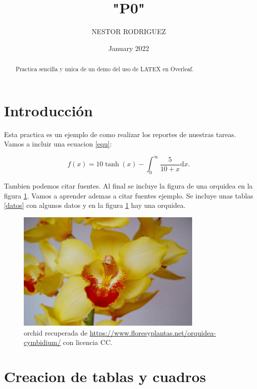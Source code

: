 \documentclass{article}
\title{"P0"} %
\author{NESTOR RODRIGUEZ} %
\date{January 2022}
\begin{document}

\maketitle %

\begin{abstract} %
  Practica sencilla y unica de un demo del uso de LATEX en
  Overleaf.
\end{abstract}

\section{Introducci\'{o}n}\label{intro} %



Esta practica es un ejemplo de como realizar los reportes de nuestras tareas. Vamos a incluir una ecuacion \eqref{equ}:

\begin{equation}
  f(x) = 10 \tanh(x) - \int_0^\infty \frac{5}{10 + x} \text{d}x.
  \label{equ}
\end{equation}

Tambien podemos citar fuentes. Al final se incluye la figura de una orquidea en la figura \ref{flor}. Vamos a aprender ademas a citar fuentes {ejemplo}.
Se incluye unas tablas \ref{datos} con algunos datos y en la figura \citep{imagen} \ref{flor} hay una orquidea.

\begin{figure} %
    \centering
    \includegraphics [width=90mm]{orchid.jpg} %
    \caption{orchid recuperada de \url{https://www.floresyplantas.net/orquidea-cymbidium/} con licencia CC.}
    \label{flor}
\end{figure}

\newpage

\section{Creacion de tablas y cuadros}
\end{document}
